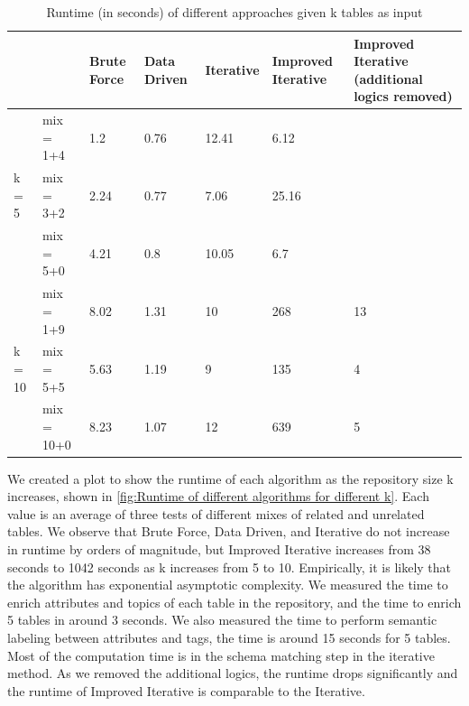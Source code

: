 \begin{table}[h!]
    \centering
    \scriptsize
    \begin{center}
      \caption{Runtime (in seconds) of different approaches given k tables as input}
      \label{tab:Runtime-of-different-approaches-given-k-tables-as-input}
      \begin{tabular}{|p{}|p{}|p{}|p{}|p{}|p{}|p{}|}  
        \hline
         & & \textbf{Brute Force} & \textbf{Data Driven} & \textbf{Iterative} & \textbf{Improved Iterative} & \textbf{Improved Iterative (additional logics removed)}\\
        \hline
        \multirow{3}{*}{k = 5} & mix = 1+4 & 1.2 & 0.76 & 12.41 & 6.12 & \\
        \cline{2-7}
        & mix = 3+2 & 2.24 & 0.77 & 7.06 & 25.16 & \\
        \cline{2-7}
        & mix = 5+0 & 4.21 & 0.8 & 10.05 & 6.7 & \\
        \hline        
        \multirow{3}{*}{k = 10} & mix = 1+9 & 8.02 & 1.31 & 10 & 268 & 13 \\
        \cline{2-7}
        & mix = 5+5 & 5.63 & 1.19 & 9 & 135 & 4 \\
        \cline{2-7}
        & mix = 10+0 & 8.23 & 1.07 & 12 & 639 & 5 \\
        \hline
      \end{tabular}
    \end{center}
\end{table}

We created a plot to show the runtime of each algorithm as the repository size k increases, shown in \autoref{fig:Runtime of different algorithms for different k}. Each value is an average of three tests of different mixes of related and unrelated tables. We observe that Brute Force, Data Driven, and Iterative do not increase in runtime by orders of magnitude, but Improved Iterative increases from 38 seconds to 1042 seconds as k increases from 5 to 10. Empirically, it is likely that the algorithm has exponential asymptotic complexity. We measured the time to enrich attributes and topics of each table in the repository, and the time to enrich 5 tables in around 3 seconds. We also measured the time to perform semantic labeling between attributes and tags, the time is around 15 seconds for 5 tables. Most of the computation time is in the schema matching step in the iterative method. As we removed the additional logics, the runtime drops significantly and the runtime of Improved Iterative is comparable to the Iterative.

